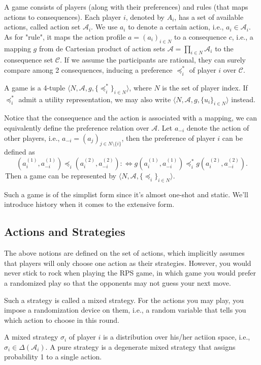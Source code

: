 A game consists of players (along with their preferences) and rules (that maps actions to consequences). Each player $i$, denoted by $A_i$, has a set of available actions, called action set $\mathcal{A}_i$. 
We use $a_i$ to denote a certain action, i.e., $a_i\in \mathcal{A}_i$. As for "rule", it maps the action profile $a = (a_i)_{i\in N}$ to a consequence $c$, i.e., a mapping $g$ from de Cartesian product of action sets $\mathcal{A} = \prod_{i\in N} \mathcal{A}_i$ to the consequence set $\mathcal{C}$.
If we assume the participants are rational, they can surely compare among 2 consequences, inducing a preference $\preceq^*_i$ of player $i$ over $\mathcal{C}$.

\begin{definition}[Game]
    A game is a 4-tuple $\langle N,\mathcal{A}, g, \{\preceq_i^*\}_{i\in N}  \rangle $, where $N$ is the set of player index. If $\preceq_i^*$ admit a utility representation, 
    we may also write $\langle N,\mathcal{A}, g, \{u_i\}_{i\in N}  \rangle $ instead.
\end{definition}

Notice that the consequence and the action is associated with a mapping, we can equivalently define the preference relation over $\mathcal{A}$. Let $a_{-i}$ denote the action of other players, i.e., $a_{-i} = (a_j)_{j\in N \setminus \{i\}}$, then
the preference of player $i$ can be defined as $$(a^{(1)}_i,a^{(1)}_{-i}) \preceq_i (a^{(2)}_i,a^{(2)}_{-i}) :\iff g(a^{(1)}_i,a^{(1)}_{-i}) \preceq_i^* g(a^{(2)}_i,a^{(2)}_{-i}).$$
\,Then a game can be represented by $\langle N,\mathcal{A}, \{\preceq_i\}_{i\in N}  \rangle$.

Such a game is of the simplist form since it's almost one-shot and static. We'll introduce history when it comes to the extensive form.

\subsection{Actions and Strategies}
The above notions are defined on the set of actions, which implicitly assumes that players will only choose one action as their strategies. However, you would never stick to rock when playing the RPS game, in which game you would prefer a randomized play so that the opponents may not guess your next move.

Such a strategy is called a mixed strategy. For the actions you may play, you impose a randomization device on them, i.e., a random variable that tells you which action to choose in this round.
\begin{definition}
    A mixed strategy $\sigma_i$ of player $i$ is a distribution over his/her actiion space, i.e., $\sigma_i\in\Delta(\mathcal{A}_i)$. A pure strategy is a degenerate mixed strategy that assigns probability 1 to a single action.
\end{definition}

